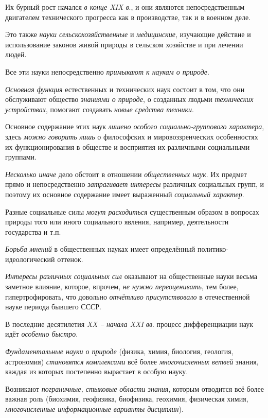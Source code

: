 \documentclass[a4paper,14pt,russian]{extreport}
\begin{document}
Их бурный рост начался \emph{в конце XIX в}., и они являются непосредственным двигателем технического прогресса как в производстве, так и в военном деле.

Это также \emph{науки сельскохозяйственные} и \emph{медицинские}, изучающие действие и использование законов живой природы в сельском хозяйстве и при лечении людей.

Все эти науки непосредственно \emph{примыкают к наукам о природе}.

\emph{Основная функция} естественных и технических наук состоит в том, что они обслуживают общество \emph{знаниями о природе}, о созданных людьми \emph{технических устройствах}, помогают создавать \emph{новые средства техники}.

Основное содержание этих наук \emph{лишено особого социально-группового характера}, здесь \emph{можно говорить лишь} о философских и мировоззренческих особенностях их функционирования в обществе и восприятия их различными социальными группами.

\emph{Несколько иначе} дело обстоит в отношении \emph{общественных наук}. Их предмет прямо и непосредственно \emph{затрагивает интересы} различных социальных групп, и поэтому их основное содержание имеет выраженный \emph{социальный характер}.

Разные социальные силы \emph{могут расходиться} существенным образом в вопросах природы того или иного социального явления, например, деятельности государства и т.п.

\emph{Борьба мнений} в общественных науках имеет определённый политико-идеологический оттенок.

\emph{Интересы различных социальных сил} оказывают на общественные науки весьма заметное влияние, которое, впрочем, \emph{не нужно переоценивать}, тем более, гипертрофировать, что довольно \emph{отчётливо присутствовало} в отечественной науке периода бывшего СССР.

В последние десятилетия \emph{XX -- начала XXI вв}. процесс дифференциации наук идёт \emph{особенно быстро}.

\emph{Фундаментальные науки о природе} (физика, химия, биология, геология, астрономия) \emph{становятся комплексами} всё более \emph{многочисленных ветвей} знания, каждая из которых постепенно вырастает в особую науку.

Возникают \emph{пограничные, стыковые области знания}, которым отводится всё более важная роль (биохимия, геофизика, биофизика, геохимия, физическая химия, \emph{многочисленные информационные варианты дисциплин}).
\end{document}
